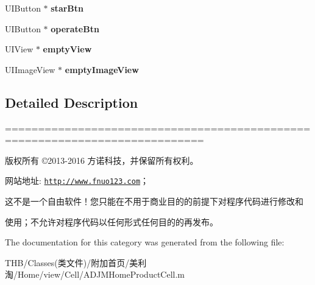 \begin{DoxyCompactItemize}
U\+I\+Button $\ast$ {\bfseries star\+Btn}
\item 
\mbox{\label{category_a_d_j_m_home_product_cell_07_08_a7db275ce5ea3819b3ee716a34d4e5938}} 
U\+I\+Button $\ast$ {\bfseries operate\+Btn}
\item 
\mbox{\label{category_a_d_j_m_home_product_cell_07_08_a5b2ae0d01c12eebd77d3f83f5f062b65}} 
U\+I\+View $\ast$ {\bfseries empty\+View}
\item 
\mbox{\label{category_a_d_j_m_home_product_cell_07_08_adb0faef5a2a8c3039cf495d79f140cec}} 
U\+I\+Image\+View $\ast$ {\bfseries empty\+Image\+View}
\end{DoxyCompactItemize}


\subsection{Detailed Description}
============================================================================

版权所有 ©2013-\/2016 方诺科技，并保留所有权利。

网站地址\+: \href{http://www.fnuo123.com}{\tt http\+://www.\+fnuo123.\+com}； 



这不是一个自由软件！您只能在不用于商业目的的前提下对程序代码进行修改和

使用；不允许对程序代码以任何形式任何目的的再发布。 

 

The documentation for this category was generated from the following file\+:\begin{DoxyCompactItemize}
\item 
T\+H\+B/\+Classes(类文件)/附加首页/美利淘/\+Home/view/\+Cell/A\+D\+J\+M\+Home\+Product\+Cell.\+m\end{DoxyCompactItemize}
